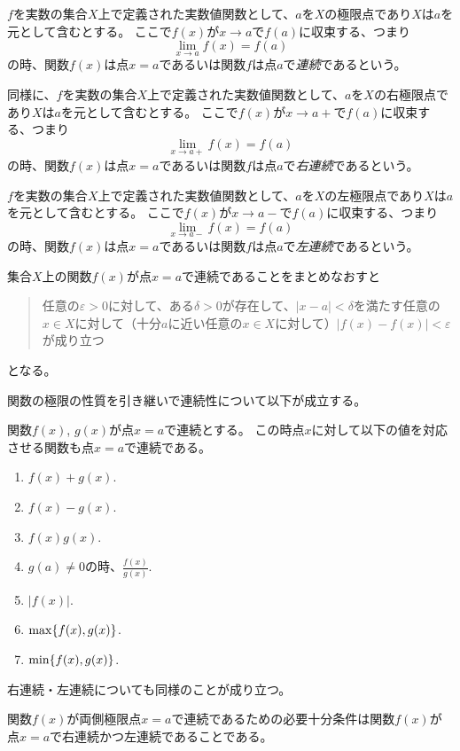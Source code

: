 \begin{definition}[連続性]
$f$を実数の集合$X$上で定義された実数値関数として、$a$を$X$の極限点であり$X$は$a$を元として含むとする。
ここで$f(x)$が$x \to a$で$f(a)$に収束する、つまり
$$
\lim_{x \to a}f(x) = f(a)
$$
の時、関数$f(x)$は点$x = a$であるいは関数$f$は点$a$で\emph{連続}であるという。

同様に、$f$を実数の集合$X$上で定義された実数値関数として、$a$を$X$の右極限点であり$X$は$a$を元として含むとする。
ここで$f(x)$が$x \to a+$で$f(a)$に収束する、つまり
$$
\lim_{x \to a+}f(x) = f(a)
$$
の時、関数$f(x)$は点$x = a$であるいは関数$f$は点$a$で\emph{右連続}であるという。

$f$を実数の集合$X$上で定義された実数値関数として、$a$を$X$の左極限点であり$X$は$a$を元として含むとする。
ここで$f(x)$が$x \to a-$で$f(a)$に収束する、つまり
$$
\lim_{x \to a-}f(x) = f(a)
$$
の時、関数$f(x)$は点$x = a$であるいは関数$f$は点$a$で\emph{左連続}であるという。
\end{definition}

\begin{remark}
集合$X$上の関数$f(x)$が点$x = a$で連続であることをまとめなおすと
\begin{quote}
任意の$\varepsilon > 0$に対して、ある$\delta > 0$が存在して、$|x-a| < \delta$を満たす任意の$x \in X$に対して（十分$a$に近い任意の$x \in X$に対して）$|f(x)-f(x)| < \varepsilon$が成り立つ
\end{quote}
となる。
\end{remark}

関数の極限の性質を引き継いで連続性について以下が成立する。

\begin{proposition}[連続と演算]
関数$f(x)$, $g(x)$が点$x = a$で連続とする。
この時点$x$に対して以下の値を対応させる関数も点$x = a$で連続である。
\begin{enumerate}
\item
$f(x)+g(x)$.
\item
$f(x)-g(x)$.
\item
$f(x)g(x)$.
\item
$g(a) \ne 0$の時、$\frac{f(x)}{g(x)}$.
\item
$|f(x)|$.
\item
$\max\{ f(x), g(x) \}$.
\item
$\min\{ f(x), g(x) \}$.
\end{enumerate}
右連続・左連続についても同様のことが成り立つ。
\end{proposition}

\begin{proposition}
関数$f(x)$が両側極限点$x = a$で連続であるための必要十分条件は関数$f(x)$が点$x = a$で右連続かつ左連続であることである。
\end{proposition}

